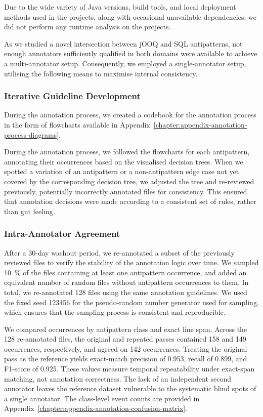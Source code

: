 Due to the wide variety of Java versions, build tools, and local deployment methods used in the projects, along with occasional unavailable dependencies, we did not perform any runtime analysis on the projects.

As we studied a novel intersection between jOOQ and SQL antipatterns, not enough annotators sufficiently qualified in both domains were available to achieve a multi-annotator setup. Consequently, we employed a single-annotator setup, utilising the following means to maximise internal consistency.

\subsubsection*{Iterative Guideline Development}

During the annotation process, we created a codebook for the annotation process in the form of flowcharts available in Appendix~\ref{chapter:appendix-annotation-process-diagrams}.

During the annotation process, we followed the flowcharts for each antipattern, annotating their occurrences based on the visualised decision trees. When we spotted a variation of an antipattern or a non-antipattern edge case not yet covered by the corresponding decision tree, we adjusted the tree and re-reviewed previously, potentially incorrectly annotated files for consistency. This ensured that annotation decisions were made according to a consistent set of rules, rather than gut feeling.

\subsubsection*{Intra-Annotator Agreement}

After a 30-day washout period, we re-annotated a subset of the previously reviewed files to verify the stability of the annotation logic over time. We sampled \qty{10}{\percent} of the files containing at least one antipattern occurrence, and added an equivalent number of random files without antipattern occurrences to them. In total, we re-annotated \num{128} files using the same annotation guidelines. We used the fixed seed \num{123456} for the pseudo-random number generator used for sampling, which ensures that the sampling process is consistent and reproducible.

We compared occurrences by antipattern class and exact line span. Across the \num{128} re-annotated files, the original and repeated passes contained \num{158} and \num{149} occurrences, respectively, and agreed on \num{142} occurrences. Treating the original pass as the reference yields exact-match precision of \num{0.953}, recall of \num{0.899}, and F1-score of \num{0.925}. These values measure temporal repeatability under exact-span matching, not annotation correctness. The lack of an independent second annotator leaves the reference dataset vulnerable to the systematic blind spots of a single annotator. The class-level event counts are provided in Appendix~\ref{chapter:appendix-annotation-confusion-matrix}.

